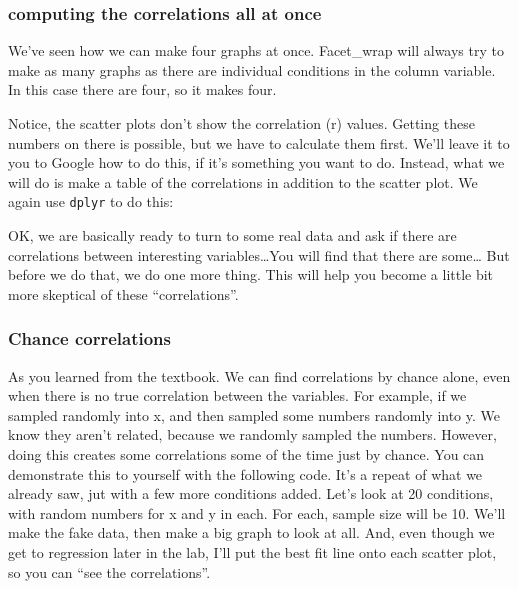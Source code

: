 \documentclass[]{book}
\begin{document}
\subsubsection{computing the correlations all at
once}\label{computing-the-correlations-all-at-once}

We've seen how we can make four graphs at once. Facet\_wrap will always
try to make as many graphs as there are individual conditions in the
column variable. In this case there are four, so it makes four.

Notice, the scatter plots don't show the correlation (r) values. Getting
these numbers on there is possible, but we have to calculate them first.
We'll leave it to you to Google how to do this, if it's something you
want to do. Instead, what we will do is make a table of the correlations
in addition to the scatter plot. We again use \texttt{dplyr} to do this:

OK, we are basically ready to turn to some real data and ask if there
are correlations between interesting variables\ldots{}You will find that
there are some\ldots{} But before we do that, we do one more thing. This
will help you become a little bit more skeptical of these
``correlations''.

\subsubsection{Chance correlations}\label{chance-correlations}

As you learned from the textbook. We can find correlations by chance
alone, even when there is no true correlation between the variables. For
example, if we sampled randomly into x, and then sampled some numbers
randomly into y. We know they aren't related, because we randomly
sampled the numbers. However, doing this creates some correlations some
of the time just by chance. You can demonstrate this to yourself with
the following code. It's a repeat of what we already saw, jut with a few
more conditions added. Let's look at 20 conditions, with random numbers
for x and y in each. For each, sample size will be 10. We'll make the
fake data, then make a big graph to look at all. And, even though we get
to regression later in the lab, I'll put the best fit line onto each
scatter plot, so you can ``see the correlations''.
\end{document}
